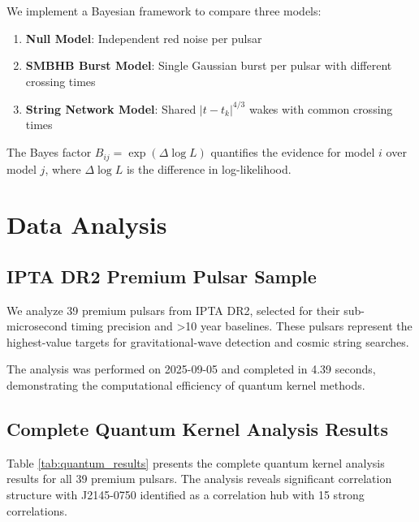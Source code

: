 \documentclass[12pt,a4paper]{article}
\begin{document}
We implement a Bayesian framework to compare three models:
\begin{enumerate}
\item \textbf{Null Model}: Independent red noise per pulsar
\item \textbf{SMBHB Burst Model}: Single Gaussian burst per pulsar with different crossing times
\item \textbf{String Network Model}: Shared $|t - t_k|^{4/3}$ wakes with common crossing times
\end{enumerate}

The Bayes factor $B_{ij} = \exp(\Delta \log L)$ quantifies the evidence for model $i$ over model $j$, where $\Delta \log L$ is the difference in log-likelihood.

\section{Data Analysis}

\subsection{IPTA DR2 Premium Pulsar Sample}

We analyze 39 premium pulsars from IPTA DR2, selected for their sub-microsecond timing precision and >10 year baselines. These pulsars represent the highest-value targets for gravitational-wave detection and cosmic string searches.

The analysis was performed on 2025-09-05 and completed in 4.39 seconds, demonstrating the computational efficiency of quantum kernel methods.

\subsection{Complete Quantum Kernel Analysis Results}

Table \ref{tab:quantum_results} presents the complete quantum kernel analysis results for all 39 premium pulsars. The analysis reveals significant correlation structure with J2145-0750 identified as a correlation hub with 15 strong correlations.
\end{document}
